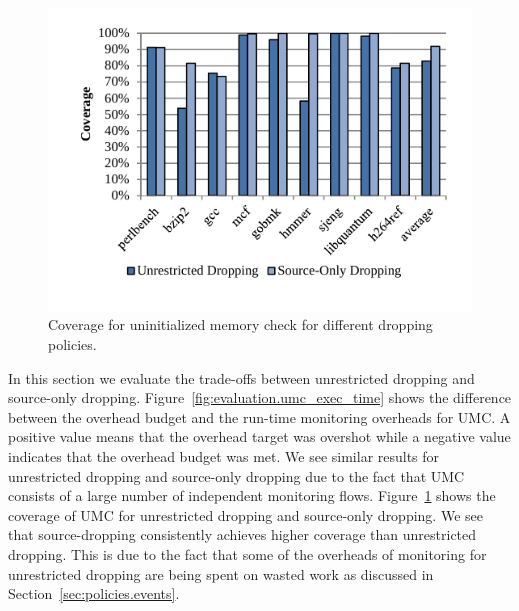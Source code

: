 \begin{figure}
  \begin{center}
    \includegraphics[width=\columnwidth]{figs/data_umc_coverage.pdf}
    \vspace{-0.2in}
    \caption{Coverage for uninitialized memory check for different dropping policies.}
    \label{fig:evaluation.umc_coverage}
    \vspace{-0.1in}
  \end{center}
\end{figure}
In this section we evaluate the trade-offs between unrestricted dropping and source-only dropping.
Figure~\ref{fig:evaluation.umc_exec_time} shows the difference between the
overhead budget and the run-time monitoring overheads for UMC. A positive value
means that the overhead target was overshot while a negative value indicates
that the overhead budget was met. We see similar results for unrestricted
dropping and source-only dropping due to the fact that UMC consists of a large
number of independent monitoring flows.
Figure~\ref{fig:evaluation.umc_coverage} shows the coverage of UMC for
unrestricted dropping and source-only dropping. We see that source-dropping
consistently achieves higher coverage than unrestricted dropping. This is due
to the fact that some of the overheads of monitoring for unrestricted dropping
are being spent on wasted work as discussed in Section~\ref{sec:policies.events}.

